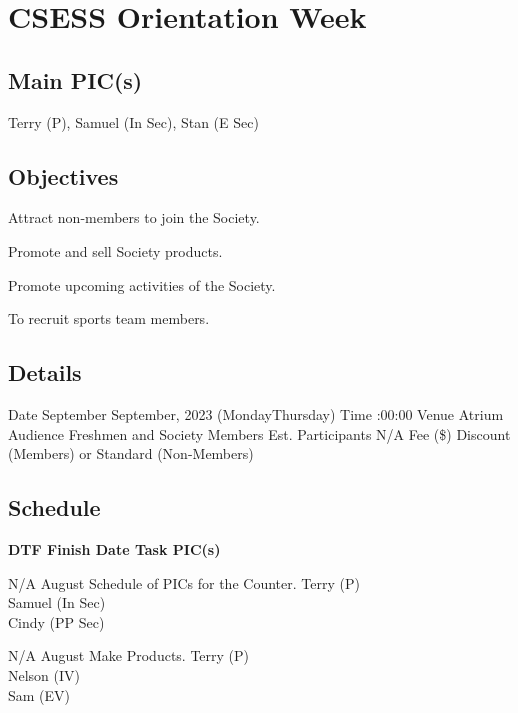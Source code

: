 \section{CSESS Orientation Week}

\subsection{Main PIC(s)}
Terry (P), Samuel (In Sec), Stan (E Sec)

\subsection{Objectives}
\startitemize
\item Attract non-members to join the Society.
\item Promote and sell Society products.
\item Promote upcoming activities of the Society.
\item To recruit sports team members.
\stopitemize

\subsection{Details}
\starttabulate[|rB|l|]
\NC Date
 September  September, 2023 (Monday\endash Thursday) \NR
\NC Time
:00:00 \NR
\NC Venue
\NC Atrium \NR
\NC Audience
\NC Freshmen and Society Members \NR
\NC Est. Participants
\NC N/A \NR
\NC Fee (\$)
\NC Discount (Members) or Standard (Non-Members) \NR
\stoptabulate

\subsection{Schedule}

\setupTABLE[c][1][width=0.75in]
\setupTABLE[c][2][width=1in]
\setupTABLE[c][3][width=3in]
\setupTABLE[c][4][width=1.25in]
\bTABLE
\bTABLEhead

\bTR\bTH    \bf{DTF}
\eTH\bTH    \bf{Finish Date}
\eTH\bTH    \bf{Task}
\eTH\bTH    \bf{PIC(s)}
\eTH\eTR

\eTABLEhead
\bTABLEbody

\bTR\bTD N/A
\eTD{} August
\eTD\bTD Schedule of PICs for the Counter.
\eTD\bTD Terry (P) \\ Samuel (In Sec) \\ Cindy (PP Sec)
\eTD\eTR

\bTR\bTD N/A
\eTD{} August
\eTD\bTD Make Products.
\eTD\bTD Terry (P) \\ Nelson (IV) \\ Sam (EV)
\eTD\eTR

